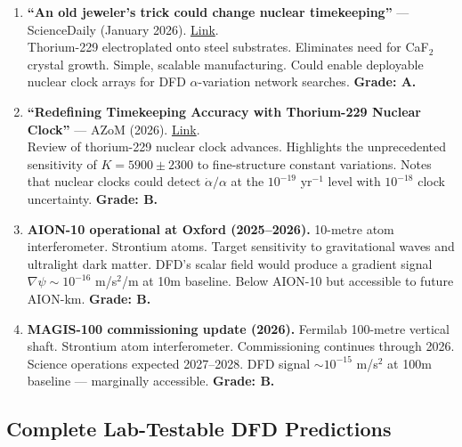 \documentclass[11pt,a4paper]{article}
\begin{document}
\begin{enumerate}
\item \textbf{``An old jeweler's trick could change nuclear timekeeping''} --- ScienceDaily (January 2026). \href{https://www.sciencedaily.com/releases/2026/01/260107225542.htm}{Link}.\\
Thorium-229 electroplated onto steel substrates. Eliminates need for CaF$_2$ crystal growth. Simple, scalable manufacturing. Could enable deployable nuclear clock arrays for DFD $\alpha$-variation network searches. \textbf{Grade: A.}

\item \textbf{``Redefining Timekeeping Accuracy with Thorium-229 Nuclear Clock''} --- AZoM (2026). \href{https://www.azom.com/article.aspx?ArticleID=24834}{Link}.\\
Review of thorium-229 nuclear clock advances. Highlights the unprecedented sensitivity of $K = 5900 \pm 2300$ to fine-structure constant variations. Notes that nuclear clocks could detect $\dot\alpha/\alpha$ at the $10^{-19}$ yr$^{-1}$ level with $10^{-18}$ clock uncertainty. \textbf{Grade: B.}

\item \textbf{AION-10 operational at Oxford (2025--2026).} 10-metre atom interferometer. Strontium atoms. Target sensitivity to gravitational waves and ultralight dark matter. DFD's scalar field would produce a gradient signal $\nabla\psi \sim 10^{-16}$ m/s$^2$/m at 10m baseline. Below AION-10 but accessible to future AION-km. \textbf{Grade: B.}

\item \textbf{MAGIS-100 commissioning update (2026).} Fermilab 100-metre vertical shaft. Strontium atom interferometer. Commissioning continues through 2026. Science operations expected 2027--2028. DFD signal $\sim 10^{-15}$ m/s$^2$ at 100m baseline --- marginally accessible. \textbf{Grade: B.}
\end{enumerate}

\subsection{Complete Lab-Testable DFD Predictions}
\end{document}
